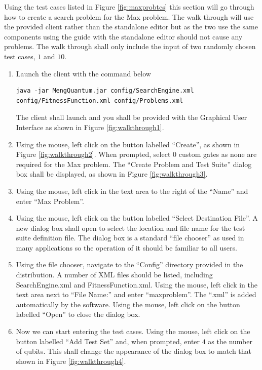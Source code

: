 Using the test cases listed in Figure \ref{fig:maxprobtcs} this section will go through how to create a search problem for the Max problem.
The walk through will use the provided client rather than the standalone editor but as the two use the same components using the guide with the standalone editor should not cause any problems.
The walk through shall only include the input of two randomly chosen test cases, $1$ and $10$.

\lstset{language=bash,breaklines=true,breakatwhitespace=false,numbers=none}
\begin{enumerate}
 \item Launch the client with the command below
\begin{lstlisting}
java -jar MengQuantum.jar config/SearchEngine.xml config/FitnessFunction.xml config/Problems.xml
\end{lstlisting}
The client shall launch and you shall be provided with the Graphical User Interface as shown in Figure \ref{fig:walkthrough1}.

\item Using the mouse, left click on the button labelled ``Create'', as shown in Figure \ref{fig:walkthrough2}.
When prompted, select 0 custom gates as none are required for the Max problem.
The ``Create Problem and Test Suite'' dialog box shall be displayed, as shown in Figure \ref{fig:walkthrough3}.

\item Using the mouse, left click in the text area to the right of the ``Name'' and enter ``Max Problem''.

\item Using the mouse, left click on the button labelled ``Select Destination File''.
A new dialog box shall open to select the location and file name for the test suite definition file.
The dialog box is a standard ``file chooser'' as used in many applications so the operation of it should be familiar to all users.

\item Using the file chooser, navigate to the ``Config'' directory provided in the distribution.
A number of XML files should be listed, including SearchEngine.xml and FitnessFunction.xml.
Using the mouse, left click in the text area next to ``File Name:'' and enter ``maxproblem''.
The ``.xml'' is added automatically by the software.
Using the mouse, left click on the button labelled ``Open'' to close the dialog box.

\item Now we can start entering the test cases.
Using the mouse, left click on the button labelled ``Add Test Set'' and, when prompted, enter $4$ as the number of qubits.
This shall change the appearance of the dialog box to match that shown in Figure \ref{fig:walkthrough4}.


\end{enumerate}
